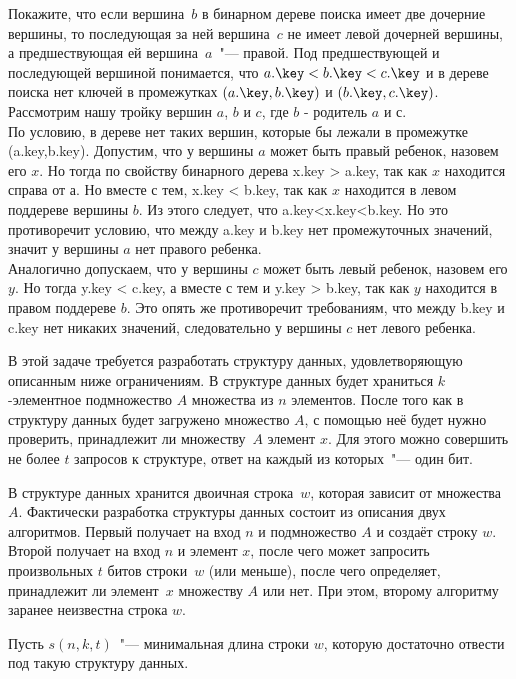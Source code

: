 \documentclass[12pt]{extreport}
\theoremstyle{definiton}
\theoremstyle{definition}
\theoremstyle{definition}
\begin{document}
			\Pr[3] Покажите, что если вершина~$b$ в бинарном дереве поиска имеет две дочерние вершины, то последующая за ней вершина~$c$ не имеет левой дочерней вершины, а предшествующая ей вершина~$a$~"--- правой. Под предшествующей и последующей вершиной понимается, что $a.\key < b.\key < c.\key$ и в дереве поиска нет ключей в промежутках $(a.\key,b.\key)$ и $(b.\key,c.\key)$.
			\newline
			\\ Рассмотрим нашу тройку вершин $a$, $b$ и $c$, где $b$ - родитель $a$ и $с$.
			\\ По условию, в дереве нет таких вершин, которые бы лежали в промежутке (a.key,b.key). Допустим, что у вершины $a$ может быть правый ребенок, назовем его $x$. Но тогда по свойству бинарного дерева x.key > a.key, так как $x$ находится справа от $а$. Но вместе с тем, x.key < b.key, так как $x$ находится в левом поддереве вершины $b$. Из этого следует, что a.key<x.key<b.key. Но это противоречит условию, что между a.key и b.key нет промежуточных значений, значит у вершины $a$ нет правого ребенка.
			\\ Аналогично допускаем, что у вершины $c$ может быть левый ребенок, назовем его $y$. Но тогда y.key < c.key, а вместе с тем и y.key > b.key, так как $y$ находится в правом поддереве $b$. Это опять же противоречит требованиям, что между b.key и c.key нет никаких значений, следовательно у вершины $c$ нет левого ребенка.

			\Pr[3+5] В этой задаче требуется разработать структуру данных, удовлетворяющую описанным ниже ограничениям.
			В структуре данных будет храниться $k$-элементное подмножество $A$ множества из $n$ элементов. После того как в структуру данных будет загружено множество $A$, с помощью неё будет нужно проверить, принадлежит ли множеству~$A$ элемент $x$. Для этого можно совершить не более $t$ запросов к структуре, ответ на каждый из которых~"--- один бит.

			В структуре данных хранится двоичная строка~$w$, которая зависит от множества~$A$. Фактически разработка структуры данных состоит из описания двух алгоритмов. Первый получает на вход $n$ и подмножество $A$ и создаёт строку $w$. Второй получает на вход $n$ и элемент $x$, после чего может запросить произвольных $t$ битов строки~$w$ (или меньше), после чего определяет, принадлежит ли элемент~$x$ множеству $A$ или нет. При этом, второму алгоритму заранее неизвестна строка $w$.
			
			  Пусть $s(n,k,t)$~"--- минимальная длина строки $w$, которую достаточно отвести под такую структуру данных.
\end{document}
